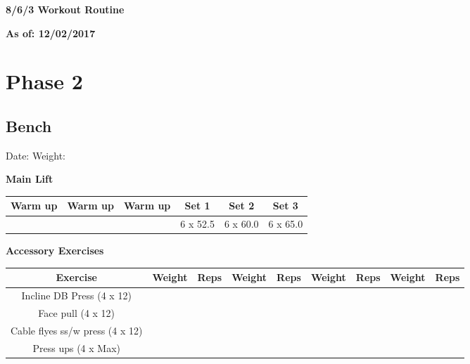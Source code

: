 \documentclass{article}%
\begin{document}
%
\normalsize%
\pagestyle{header}%
\linebreak%
\begin{Large}%
\textbf{8/6/3 Workout Routine}%
\end{Large}%
\linebreak%
\begin{large}%
\textbf{As of: 12/02/2017}%
\end{large}%
\linebreak%
\section*{Phase 2}%
\subsection*{Bench}%
Date: %
\linebreak%
Weight: %
\vspace*{20pt}%
\linebreak%
\begin{minipage}{0.5\textwidth}%
\textbf{Main Lift\newline%
\newline%
}%
\begin{tabular}{|c|c|c|c|c|c|}%
\hline%
Warm up&Warm up&Warm up&Set 1&Set 2&Set 3\\%
\hline%
&&&6 x 52.5&6 x 60.0&6 x 65.0\\%
\hline%
\end{tabular}%
\vspace*{20pt}%
\linebreak%
\textbf{Accessory Exercises\newline%
\newline%
}%
\begin{tabular}{|c|c|c|c|c|c|c|c|c|}%
\hline%
Exercise&Weight&Reps&Weight&Reps&Weight&Reps&Weight&Reps\\%
\hline%
Incline DB Press (4 x 12)&&&&&&&&\\%
\hline%
Face pull (4 x 12)&&&&&&&&\\%
\hline%
Cable flyes ss/w press (4 x 12)&&&&&&&&\\%
\hline%
Press ups (4 x Max)&&&&&&&&\\%
\hline%
\end{tabular}%
\end{minipage}%
\vspace*{20pt}%
\linebreak

%
\end{document}
